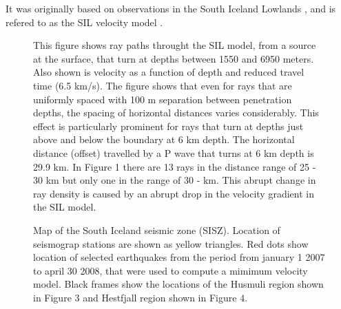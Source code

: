 \documentclass[extra]{gji}
\begin{document}
It was originally based on
observations in the South Iceland Lowlands \citep{ib93}, and is refered to as the
SIL velocity 
model \citep{rs93}.

\begin{figure}
\caption{This figure shows ray paths throught the SIL model, from a source at
the surface, that turn at depths between 1550 and 6950 meters. Also
shown is velocity as a function of depth and reduced travel time (6.5
km/s). The figure shows that even for rays that are uniformly spaced
with 100 m separation between penetration depths, the spacing of
horizontal distances varies considerably. This effect is particularly
prominent for rays that turn at depths just above and below the
boundary at 6 km depth. The horizontal distance (offset) travelled by
a P wave that turns at 6 km depth is 29.9 km. In Figure 1 there are 13
rays in the distance range of 25 - 30 km but only one in the range of
30 - km. This abrupt change in ray density is caused by an abrupt
drop in the velocity gradient in the SIL model.
	}
\end{figure}
\begin{figure}
	\caption{
Map of the South Iceland seismic zone (SISZ). Location of seismograp stations are shown as yellow triangles. Red dots show location of selected
earthquakes from the period from january 1 2007 to april 30 2008, that were 
used to compute a mimimum velocity model. Black frames show the locations of the Husmuli region shown in Figure 3 and Hestfjall region shown in Figure 4.
		}
\end{figure}
\end{document}
